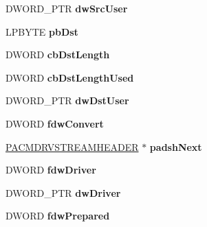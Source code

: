 \begin{DoxyCompactItemize}
D\+W\+O\+R\+D\+\_\+\+P\+TR {\bfseries dw\+Src\+User}
\item 
\mbox{\label{struct___a_c_m_d_r_v_s_t_r_e_a_m_h_e_a_d_e_r_a0e5b3ae313cde871c492856597faf4ca}} 
L\+P\+B\+Y\+TE {\bfseries pb\+Dst}
\item 
\mbox{\label{struct___a_c_m_d_r_v_s_t_r_e_a_m_h_e_a_d_e_r_adce4a0995bb00f1c2218e80a482bd127}} 
D\+W\+O\+RD {\bfseries cb\+Dst\+Length}
\item 
\mbox{\label{struct___a_c_m_d_r_v_s_t_r_e_a_m_h_e_a_d_e_r_af4aa96f2960e3dc301e375fa7daf06a6}} 
D\+W\+O\+RD {\bfseries cb\+Dst\+Length\+Used}
\item 
\mbox{\label{struct___a_c_m_d_r_v_s_t_r_e_a_m_h_e_a_d_e_r_aad93783fce42d6a2aa8f4b4ed2353230}} 
D\+W\+O\+R\+D\+\_\+\+P\+TR {\bfseries dw\+Dst\+User}
\item 
\mbox{\label{struct___a_c_m_d_r_v_s_t_r_e_a_m_h_e_a_d_e_r_a53e71b9f234ae7b1a0387ba35fa9b351}} 
D\+W\+O\+RD {\bfseries fdw\+Convert}
\item 
\mbox{\label{struct___a_c_m_d_r_v_s_t_r_e_a_m_h_e_a_d_e_r_a0c29fcdff341da8f2b44402b35ec29be}} 
\hyperlink{struct___a_c_m_d_r_v_s_t_r_e_a_m_h_e_a_d_e_r}{P\+A\+C\+M\+D\+R\+V\+S\+T\+R\+E\+A\+M\+H\+E\+A\+D\+ER} $\ast$ {\bfseries padsh\+Next}
\item 
\mbox{\label{struct___a_c_m_d_r_v_s_t_r_e_a_m_h_e_a_d_e_r_aef32e6d066a6e15fd0ef9ab720fe9db9}} 
D\+W\+O\+RD {\bfseries fdw\+Driver}
\item 
\mbox{\label{struct___a_c_m_d_r_v_s_t_r_e_a_m_h_e_a_d_e_r_a157bb1e55ae251326db70ed7137e84d1}} 
D\+W\+O\+R\+D\+\_\+\+P\+TR {\bfseries dw\+Driver}
\item 
\mbox{\label{struct___a_c_m_d_r_v_s_t_r_e_a_m_h_e_a_d_e_r_a7fd776e99238081185e7af80b9889188}} 
D\+W\+O\+RD {\bfseries fdw\+Prepared}

\end{DoxyCompactItemize}
